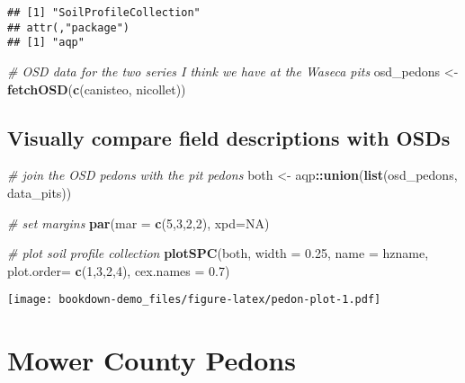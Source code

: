 \documentclass[
]{book}
\newenvironment{Shaded}{\begin{snugshade}}{\end{snugshade}}
\newcommand{\CommentTok}[1]{\textcolor[rgb]{0.56,0.35,0.01}{\textit{#1}}}
\newcommand{\DataTypeTok}[1]{\textcolor[rgb]{0.13,0.29,0.53}{#1}}
\newcommand{\DecValTok}[1]{\textcolor[rgb]{0.00,0.00,0.81}{#1}}
\newcommand{\FloatTok}[1]{\textcolor[rgb]{0.00,0.00,0.81}{#1}}
\newcommand{\KeywordTok}[1]{\textcolor[rgb]{0.13,0.29,0.53}{\textbf{#1}}}
\newcommand{\NormalTok}[1]{#1}
\newcommand{\OperatorTok}[1]{\textcolor[rgb]{0.81,0.36,0.00}{\textbf{#1}}}
\newcommand{\OtherTok}[1]{\textcolor[rgb]{0.56,0.35,0.01}{#1}}
\newcommand{\StringTok}[1]{\textcolor[rgb]{0.31,0.60,0.02}{#1}}
\begin{document}
\begin{verbatim}
## [1] "SoilProfileCollection"
## attr(,"package")
## [1] "aqp"
\end{verbatim}

\begin{Shaded}
\begin{Highlighting}[]
\CommentTok{\# OSD data for the two series I think we have at the Waseca pits}
\NormalTok{osd\_pedons \textless{}{-}}\StringTok{ }\KeywordTok{fetchOSD}\NormalTok{(}\KeywordTok{c}\NormalTok{(}\StringTok{\textquotesingle{}canisteo\textquotesingle{}}\NormalTok{, }\StringTok{\textquotesingle{}nicollet\textquotesingle{}}\NormalTok{))}
\end{Highlighting}
\end{Shaded}

\hypertarget{visually-compare-field-descriptions-with-osds}{%
\section{Visually compare field descriptions with OSDs}\label{visually-compare-field-descriptions-with-osds}}

\begin{Shaded}
\begin{Highlighting}[]
\CommentTok{\# join the OSD pedons with the pit pedons}
\NormalTok{both \textless{}{-}}\StringTok{ }\NormalTok{aqp}\OperatorTok{::}\KeywordTok{union}\NormalTok{(}\KeywordTok{list}\NormalTok{(osd\_pedons, data\_pits))}

\CommentTok{\# set margins}
\KeywordTok{par}\NormalTok{(}\DataTypeTok{mar =} \KeywordTok{c}\NormalTok{(}\DecValTok{5}\NormalTok{,}\DecValTok{3}\NormalTok{,}\DecValTok{2}\NormalTok{,}\DecValTok{2}\NormalTok{), }\DataTypeTok{xpd=}\OtherTok{NA}\NormalTok{)}

\CommentTok{\# plot soil profile collection}
\KeywordTok{plotSPC}\NormalTok{(both, }\DataTypeTok{width =} \FloatTok{0.25}\NormalTok{, }\DataTypeTok{name =} \StringTok{\textquotesingle{}hzname\textquotesingle{}}\NormalTok{, }\DataTypeTok{plot.order=} \KeywordTok{c}\NormalTok{(}\DecValTok{1}\NormalTok{,}\DecValTok{3}\NormalTok{,}\DecValTok{2}\NormalTok{,}\DecValTok{4}\NormalTok{), }\DataTypeTok{cex.names =} \FloatTok{0.7}\NormalTok{)}
\end{Highlighting}
\end{Shaded}

\texttt{[image: bookdown-demo\_files/figure-latex/pedon-plot-1.pdf]}

\hypertarget{mower-county-pedons}{%
\chapter{Mower County Pedons}\label{mower-county-pedons}}
\end{document}
